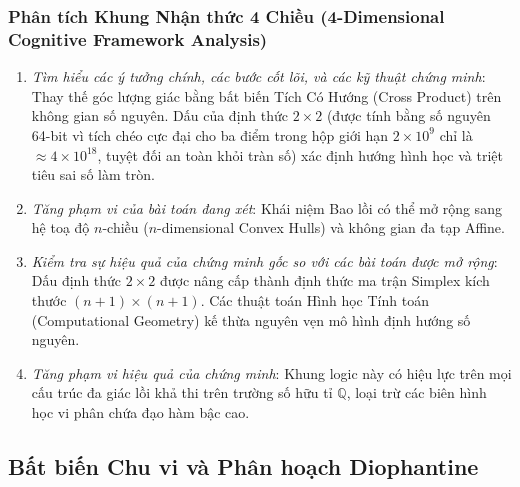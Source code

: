 \documentclass{article}
\begin{document}
\subsubsection*{Phân tích Khung Nhận thức 4 Chiều (4-Dimensional Cognitive Framework Analysis)}
\begin{enumerate}
 \item \textit{Tìm hiểu các ý tưởng chính, các bước cốt lõi, và các kỹ thuật chứng minh}: Thay thế góc lượng giác bằng bất biến Tích Có Hướng (Cross Product) trên không gian số nguyên. Dấu của định thức $2 \times 2$ (được tính bằng số nguyên 64-bit vì tích chéo cực đại cho ba điểm trong hộp giới hạn $2 \times 10^9$ chỉ là $\approx 4 \times 10^{18}$, tuyệt đối an toàn khỏi tràn số) xác định hướng hình học và triệt tiêu sai số làm tròn.
 \item \textit{Tăng phạm vi của bài toán đang xét}: Khái niệm Bao lồi có thể mở rộng sang hệ toạ độ $n$-chiều ($n$-dimensional Convex Hulls) và không gian đa tạp Affine.
 \item \textit{Kiểm tra sự hiệu quả của chứng minh gốc so với các bài toán được mở rộng}: Dấu định thức $2 \times 2$ được nâng cấp thành định thức ma trận Simplex kích thước $(n+1) \times (n+1)$. Các thuật toán Hình học Tính toán (Computational Geometry) kế thừa nguyên vẹn mô hình định hướng số nguyên.
 \item \textit{Tăng phạm vi hiệu quả của chứng minh}: Khung logic này có hiệu lực trên mọi cấu trúc đa giác lồi khả thi trên trường số hữu tỉ $\mathbb{Q}$, loại trừ các biên hình học vi phân chứa đạo hàm bậc cao.
\end{enumerate}


\subsection{Bất biến Chu vi và Phân hoạch Diophantine}
\end{document}
